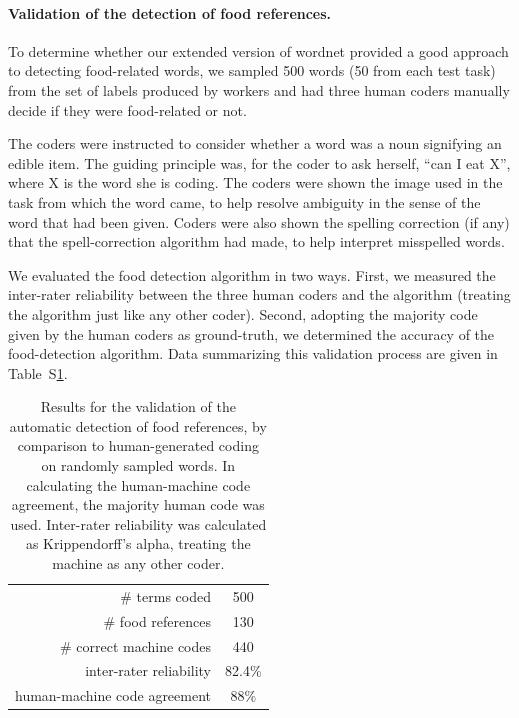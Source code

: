 \documentclass[12pt]{article}
\begin{document}
\paragraph{Validation of the detection of food references.}
To determine whether our extended version of wordnet provided a good approach
to detecting food-related words, we sampled 500 words 
(50 from each test task)  from the set of labels produced by workers and had 
three human coders manually decide if they were 
food-related or not.

The coders were instructed to consider whether a word was a noun signifying
an edible item.  The guiding principle was, for the coder to ask herself,
``can I eat X'', where X is the word she is coding.  The coders were
shown the image used in the task from which the word came, to help resolve ambiguity
in the sense of the word that had been given.  Coders were also shown the 
spelling correction (if any) that the spell-correction algorithm had made,
to help interpret misspelled words.

We evaluated the food detection algorithm in two ways.  First, we measured
the inter-rater reliability between the three human coders and the algorithm
(treating the algorithm just like any other coder).  Second, adopting the 
majority code given by the human coders as ground-truth, we determined the 
accuracy of the food-detection algorithm.  
Data summarizing this validation process are given
in Table~S\ref{table:inter-rater}.

\begin{table}
\centering
\setlength{\tabcolsep}{12pt}
\begin{tabular}{ r | c }
\toprule    
\# terms coded & 500 \\
\# food references & 130 \\
\# correct machine codes & 440 \\
inter-rater reliability & 82.4\% \\
human-machine code agreement & 88\% \\
\bottomrule
\end{tabular}
\caption{
	Results for the validation 
	of the automatic detection of food references, by comparison to
	human-generated coding on randomly sampled words.  In calculating the 
	human-machine code agreement, the majority human code was used.
	Inter-rater reliability was calculated as Krippendorff's alpha, treating
	the machine as any other coder.
}
\label{table:inter-rater}
\end{table}
\end{document}

